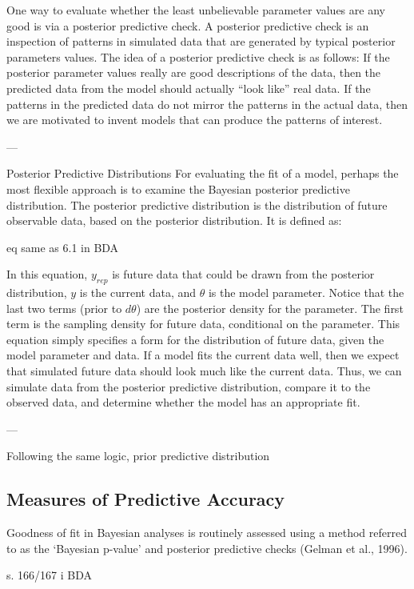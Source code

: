 One way to evaluate whether the least unbelievable parameter values are any good is via a posterior predictive check. A posterior predictive check is an inspection of patterns in simulated data that are generated by typical posterior parameters values. The idea of a posterior predictive check is as follows: If the posterior parameter values really are good descriptions of the data, then the predicted data from the model should actually “look like” real data. If the patterns in the predicted data do not mirror the patterns in the actual data, then we are motivated to invent models that can produce the patterns of interest.

---

Posterior Predictive Distributions
For evaluating the fit of a model, perhaps the most flexible approach is to examine the Bayesian posterior predictive distribution. The posterior predictive distribution is the distribution of future observable data, based on the posterior distribution. It is defined as: 

eq same as 6.1 in BDA 

In this equation, $y_{rep}$ is future data that could be drawn from the posterior distribution, $y$ is the current data, and $\theta$ is the model parameter. Notice that the last two terms (prior to $d\theta$) are the posterior density for the parameter. The first term is the sampling density for future data, conditional on the parameter. This equation simply specifies a form for the distribution of future data, given the model parameter and data. If a model fits the current data well, then we expect that simulated future data should look much like the current data. Thus, we can simulate data from the posterior predictive distribution, compare it to the observed data, and determine whether the model has an appropriate fit. 

---

Following the same logic, prior predictive distribution  


\subsection{Measures of Predictive Accuracy}

Goodness of fit in Bayesian analyses is routinely assessed using a method referred to as the ‘Bayesian p-value’ and posterior predictive checks (Gelman et al., 1996).

s. 166/167 i BDA 


